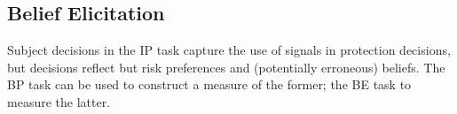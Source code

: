 \documentclass[12pt,a4paper]{article}
\begin{document}
\begin{table}[H]\centering 
\caption{Average Protection by Signal Type} 
\label{tab:nonparIP}
\end{table}



\subsection{Belief Elicitation}
Subject decisions in the IP task capture the use of signals in protection decisions, but decisions reflect but risk preferences and (potentially erroneous) beliefs.  The BP task can be used to construct a measure of the former; the BE task to measure the latter.  


\end{document}

